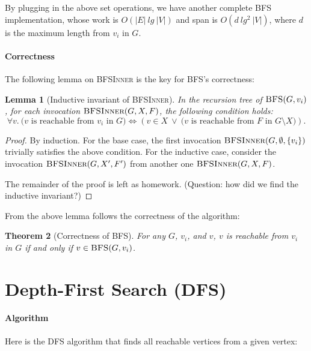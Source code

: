 \documentclass[11pt,a4paper,oneside,microtype,nokorean]{oblivoir}
\newtheorem{theorem}{Theorem}
\newtheorem{lemma}[theorem]{Lemma}
\begin{document}
By plugging in the above set operations, we have another complete BFS implementation, whose work is
$O(|E|~lg~|V|)$ and span is $O(d~lg^2~|V|)$, where $d$ is the maximum length from $v_i$ in $G$.


\paragraph{Correctness} The following lemma on \textsc{BFSInner} is the key for BFS's correctness:

\begin{lemma}[Inductive invariant of \textsc{BFSInner}] In the recursion tree of
  $\textsc{BFS}(G,v_i)$, for each invocation $\textsc{BFSInner}(G,X,F)$, the following condition
  holds:
  \[ \forall v.~\mbox{($v$ is reachable from $v_i$ in $G$)} \iff (v \in X~\lor~\mbox{($v$ is
      reachable from $F$ in $G \setminus X$)}).
  \]  
\end{lemma}
\begin{proof}
  By induction.  For the base case, the first invocation $\textsc{BFSInner}(G,\emptyset,\{v_i\})$
  trivially satisfies the above condition.  For the inductive case, consider the invocation
  $\textsc{BFSInner}(G,X',F')$ from another one $\textsc{BFSInner}(G,X,F)$.

  The remainder of the proof is left as homework.  (Question: how did we find the inductive
  invariant?)
\end{proof}

From the above lemma follows the correctness of the algorithm:

\begin{theorem}[Correctness of \textsc{BFS}] For any $G$, $v_i$, and $v$, $v$ is reachable from
  $v_i$ in $G$ if and only if $v \in \textsc{BFS}(G,v_i)$.
\end{theorem}



\section{Depth-First Search (DFS)}

\paragraph{Algorithm}

Here is the DFS algorithm that finds all reachable vertices from a given vertex:
\end{document}
